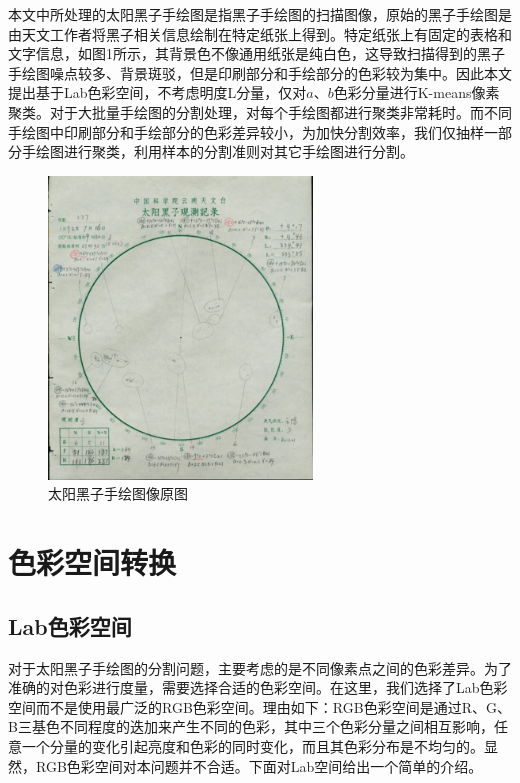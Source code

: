 \documentclass[UTF8,a4paper,twoside]{ctexart}
\begin{document}
本文中所处理的太阳黑子手绘图是指黑子手绘图的扫描图像，原始的黑子手绘图是由天文工作者将黑子相关信息绘制在特定纸张上得到。特定纸张上有固定的表格和文字信息，如图1所示，其背景色不像通用纸张是纯白色，这导致扫描得到的黑子手绘图噪点较多、背景斑驳，但是印刷部分和手绘部分的色彩较为集中。因此本文提出基于Lab色彩空间，不考虑明度L分量，仅对$a$、$b$色彩分量进行K-means像素聚类。对于大批量手绘图的分割处理，对每个手绘图都进行聚类非常耗时。而不同手绘图中印刷部分和手绘部分的色彩差异较小，为加快分割效率，我们仅抽样一部分手绘图进行聚类，利用样本的分割准则对其它手绘图进行分割。

\begin{figure}
  \centering
  \includegraphics[width=7cm]{fig01.png}
  \caption{太阳黑子手绘图像原图}
\end{figure}

\section{色彩空间转换}
\subsection{Lab色彩空间}
对于太阳黑子手绘图的分割问题，主要考虑的是不同像素点之间的色彩差异。为了准确的对色彩进行度量，需要选择合适的色彩空间。在这里，我们选择了Lab色彩空间而不是使用最广泛的RGB色彩空间。理由如下：RGB色彩空间是通过R、G、B三基色不同程度的迭加来产生不同的色彩，其中三个色彩分量之间相互影响，任意一个分量的变化引起亮度和色彩的同时变化，而且其色彩分布是不均匀的。显然，RGB色彩空间对本问题并不合适。下面对Lab空间给出一个简单的介绍。
\end{document}
